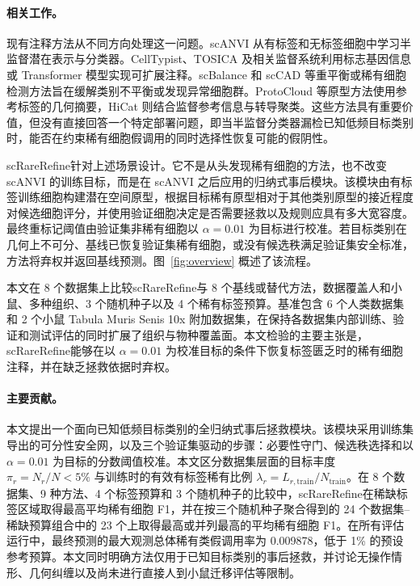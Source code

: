 \documentclass[pdflatex,sn-mathphys-num]{sn-jnl}
\theoremstyle{thmstyleone}%
\theoremstyle{thmstyletwo}%
\theoremstyle{thmstylethree}%
\newcommand{\method}{scRareRefine}
\begin{document}
\paragraph{相关工作。}
现有注释方法从不同方向处理这一问题。scANVI 从有标签和无标签细胞中学习半监督潜在表示与分类器\citep{lopez2018scvi,xu2021scanvi}。CellTypist、TOSICA 及相关监督系统利用标志基因信息或 Transformer 模型实现可扩展注释\citep{dominguez2022celltypist,chen2023tosica}。scBalance 和 scCAD 等重平衡或稀有细胞检测方法旨在缓解类别不平衡或发现异常细胞群\citep{cheng2023scbalance,xu2024sccad}。ProtoCloud 等原型方法使用参考标签的几何摘要，HiCat 则结合监督参考信息与转导聚类\citep{guo2026protocloud,bi2025hicat}。这些方法具有重要价值，但没有直接回答一个特定部署问题，即当半监督分类器漏检已知低频目标类别时，能否在约束稀有细胞假调用的同时选择性恢复可能的假阴性。

\method 针对上述场景设计。它不是从头发现稀有细胞的方法，也不改变 scANVI 的训练目标，而是在 scANVI 之后应用的归纳式事后模块。该模块由有标签训练细胞构建潜在空间原型，根据目标稀有原型相对于其他类别原型的接近程度对候选细胞评分，并使用验证细胞决定是否需要拯救以及规则应具有多大宽容度。最终重标记阈值由验证集非稀有细胞以 $\alpha=0.01$ 为目标进行校准。若目标类别在几何上不可分、基线已恢复验证集稀有细胞，或没有候选秩满足验证集安全标准，方法将弃权并返回基线预测。图~\ref{fig:overview} 概述了该流程。

本文在 8 个数据集上比较\method 与 8 个基线或替代方法，数据覆盖人和小鼠、多种组织、3 个随机种子以及 4 个稀有标签预算。基准包含 6 个人类数据集和 2 个小鼠 Tabula Muris Senis 10x 附加数据集，在保持各数据集内部训练、验证和测试评估的同时扩展了组织与物种覆盖面。本文检验的主要主张是，\method 能够在以 $\alpha=0.01$ 为校准目标的条件下恢复标签匮乏时的稀有细胞注释，并在缺乏拯救依据时弃权。

\paragraph{主要贡献。}
本文提出一个面向已知低频目标类别的全归纳式事后拯救模块。该模块采用训练集导出的可分性安全网，以及三个验证集驱动的步骤：必要性守门、候选秩选择和以 $\alpha=0.01$ 为目标的分数阈值校准。本文区分数据集层面的目标丰度 $\pi_r=N_r/N<5\%$ 与训练时的有效有标签稀有比例 $\lambda_r=L_{r,\mathrm{train}}/N_{\mathrm{train}}$。在 8 个数据集、9 种方法、4 个标签预算和 3 个随机种子的比较中，\method 在稀缺标签区域取得最高平均稀有细胞 F1，并在按三个随机种子聚合得到的 24 个数据集--稀缺预算组合中的 23 个上取得最高或并列最高的平均稀有细胞 F1。在所有评估运行中，最终预测的最大观测总体稀有类假调用率为 0.009878，低于 1\% 的预设参考预算。本文同时明确方法仅用于已知目标类别的事后拯救，并讨论无操作情形、几何纠缠以及尚未进行直接人到小鼠迁移评估等限制。
\end{document}
